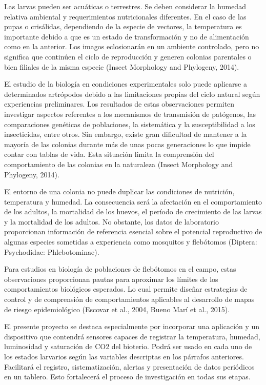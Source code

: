 \documentclass[
11pt, %
]{charter}
\begin{document}
Las larvas pueden ser acuáticas o terrestres. Se deben considerar la humedad relativa ambiental y requerimientos nutricionales diferentes. En el caso de las pupas o crisálidas, dependiendo de la especie de vectores, la temperatura es importante debido a que es un estado de transformación y no de alimentación como en la anterior. Los imagos eclosionarán en un ambiente controlado, pero no significa que continúen el ciclo de reproducción y generen colonias parentales o bien filiales de la misma especie (Insect Morphology and Phylogeny, 2014).

El estudio de la biología en condiciones experimentales solo puede aplicarse a determinados artrópodos debido a las limitaciones propias del ciclo natural según experiencias preliminares.  Los resultados de estas observaciones permiten investigar aspectos referentes a los mecanismos de transmisión de patógenos, las comparaciones genéticas de poblaciones, la sistemática y la susceptibilidad a los insecticidas, entre otros. Sin embargo, existe gran dificultad de mantener a la mayoría de las colonias durante más de unas pocas generaciones lo que impide contar con tablas de vida. Esta situación limita la comprensión del comportamiento de las colonias en la naturaleza (Insect Morphology and Phylogeny, 2014).

El entorno de una colonia no puede duplicar las condiciones de nutrición, temperatura y humedad. La consecuencia será la afectación en el comportamiento de los adultos, la mortalidad de los huevos, el período de crecimiento de las larvas y la mortalidad de los adultos. No obstante, los datos de laboratorio proporcionan información de referencia esencial sobre el potencial reproductivo de algunas especies sometidas a experiencia como mosquitos y flebótomos (Diptera: Psychodidae: Phlebotominae). 

Para estudios en biología de poblaciones de flebótomos en el campo, estas observaciones proporcionan pautas para aproximar los límites de los comportamientos biológicos esperados. Lo cual permite diseñar estrategias de control y de comprensión de comportamientos aplicables al desarrollo de mapas de riesgo epidemiológico (Escovar et al., 2004, Bueno Marí et al., 2015).


El presente proyecto se destaca especialmente por incorporar una aplicación y un dispositivo que contendrá sensores capaces de registrar la temperatura, humedad, luminosidad y saturación de CO2 del bioterio. Podrá ser usado en cada uno de los estados larvarios según las variables descriptas en los párrafos anteriores. Facilitará el registro, sistematización, alertas y presentación de datos periódicos en un tablero. Esto fortalecerá el proceso de investigación en todas sus etapas.
\end{document}
